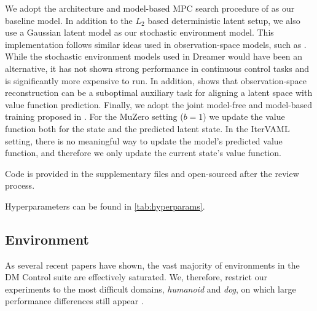 We adopt the architecture and model-based MPC search procedure of \textcite{hansen2022temporal} as our baseline model.
In addition to the $L_2$ based deterministic latent setup, we also use a Gaussian latent model as our stochastic environment model.
This implementation follows similar ideas used in observation-space models, such as \textcite{pets,mbpo}.
While the stochastic environment models used in Dreamer \parencite{hafner2021mastering} would have been an alternative, it has not shown strong performance in continuous control tasks and is significantly more expensive to run.
In addition, \textcite{voelcker2024when} shows that observation-space reconstruction can be a suboptimal auxiliary task for aligning a latent space with value function prediction.
Finally, we adopt the joint model-free and model-based training proposed in \textcite{voelcker2025mad}.
For the MuZero setting ($b=1$) we update the value function both for the state and the predicted latent state.
In the IterVAML setting, there is no meaningful way to update the model's predicted value function, and therefore we only update the current state's value function.

Code is provided in the supplementary files and open-sourced after the review process.

Hyperparameters can be found in \autoref{tab:hyperparams}.

\subsection{Environment}
\label{app:stoch_env}
As several recent papers have shown, the vast majority of environments in the DM Control suite are effectively saturated. 
We, therefore, restrict our experiments to the most difficult domains, \emph{humanoid} and \emph{dog}, on which large performance differences still appear \parencite{nauman2024bigger,voelcker2025mad,fujimoto2025towards}.

% 

